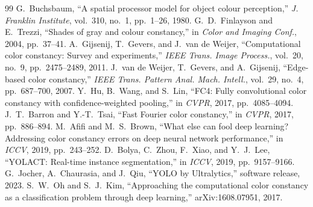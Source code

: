 \documentclass[10pt]{article}
\begin{document}
\begin{thebibliography}{99}
 G.~Buchsbaum, ``A spatial processor model for object colour perception,'' \emph{J. Franklin Institute}, vol.~310, no.~1, pp.~1--26, 1980.
 G.~D.~Finlayson and E.~Trezzi, ``Shades of gray and colour constancy,'' in \emph{Color and Imaging Conf.}, 2004, pp.~37--41.
 A.~Gijsenij, T.~Gevers, and J.~van de Weijer, ``Computational color constancy: Survey and experiments,'' \emph{IEEE Trans. Image Process.}, vol.~20, no.~9, pp.~2475--2489, 2011.
 J.~van de Weijer, T.~Gevers, and A.~Gijsenij, ``Edge-based color constancy,'' \emph{IEEE Trans. Pattern Anal. Mach. Intell.}, vol.~29, no.~4, pp.~687--700, 2007.
 Y.~Hu, B.~Wang, and S.~Lin, ``FC4: Fully convolutional color constancy with confidence-weighted pooling,'' in \emph{CVPR}, 2017, pp.~4085--4094.
 J.~T.~Barron and Y.-T.~Tsai, ``Fast Fourier color constancy,'' in \emph{CVPR}, 2017, pp.~886--894.
 M.~Afifi and M.~S.~Brown, ``What else can fool deep learning? Addressing color constancy errors on deep neural network performance,'' in \emph{ICCV}, 2019, pp.~243--252.
 D.~Bolya, C.~Zhou, F.~Xiao, and Y.~J.~Lee, ``YOLACT: Real-time instance segmentation,'' in \emph{ICCV}, 2019, pp.~9157--9166.
 G.~Jocher, A.~Chaurasia, and J.~Qiu, ``YOLO by Ultralytics,'' software release, 2023.
 S.~W.~Oh and S.~J.~Kim, ``Approaching the computational color constancy as a classification problem through deep learning,'' arXiv:1608.07951, 2017.
\end{thebibliography}
\end{document}
